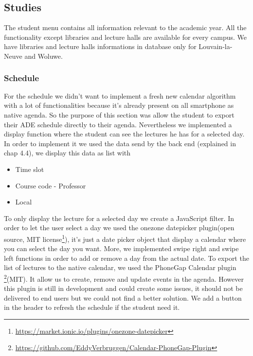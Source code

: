 \documentclass[11pt, a4paper]{report}
\begin{document}
\subsection{Studies}
The student menu contains all information relevant to the academic year. All the functionality except libraries and lecture halls are available for every campus. We have libraries and lecture halls informations in database only for Louvain-la-Neuve and Woluwe. 
\subsubsection{Schedule}
For the schedule we didn't want to implement a fresh new calendar algorithm with a lot of functionalities because it's already present on all smartphone as native agenda. So the purpose of this section was allow the student to export their ADE schedule directly to their agenda. Nevertheless we implemented a display function where the student can see the lectures he has for a selected day. In order to implement it we used the data send by the back end (explained in chap 4.4), we display this data as list with
\begin{itemize}
\item Time slot
\item Course code - Professor
\item Local
\end{itemize}
To only display the lecture for a selected day we create a JavaScript filter. In order to let the user select a day we used the onezone datepicker plugin(open source, MIT license\footnote{\url{https://market.ionic.io/plugins/onezone-datepicker}}), it's just a date picker object that display a calendar where you can select the day you want. More, we implemented swipe right and swipe left functions in order to add or remove a day from the actual date.
To export the list of lectures to the native calendar, we used the PhoneGap Calendar plugin \footnote{\url{https://github.com/EddyVerbruggen/Calendar-PhoneGap-Plugin}}(MIT). It allow us to create, remove and update events in the agenda. However this plugin is still in development and could create some issues, it should not be delivered to end users but we could not find a better solution. We add a button in the header to refresh the schedule if the student need it. 
\end{document}

